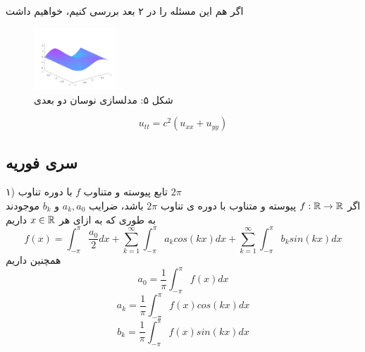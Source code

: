 اگر هم این مسئله را در ۲ بعد بررسی کنیم، خواهیم داشت\\
\begin{figure}[H]
	\centering
	\includegraphics[width=0.275\textwidth]{im05.jpg}
	\caption*{شکل ۵: مدلسازی نوسان دو بعدی\\
		\large{
		}
	}
\end{figure}
\[
u_{tt}=c^2(u_{xx}+u_{yy})
\]

\subsection*{سری فوریه}
۱) تابع پیوسته و متناوب
$f$
با دوره تناوب
$2\pi$\\
اگر 
$f:\mathbb{R}\to\mathbb{R}$
پیوسته و متناوب با دوره ی تناوب 
$2\pi$
باشد، ضرایب
$a_k,a_0$
و
$b_k$
موجودند به طوری که به ازای هر
$x\in\mathbb{R}$
داریم
\begin{equation}
	f(x)=\int_{-\pi}^{\pi}{\frac{a_0}{2}dx}+\sum_{k=1}^\infty {\int_{-\pi}^{\pi}{a_kcos(kx)dx}}+\sum_{k=1}^\infty{\int_{-\pi}^{\pi}{b_ksin(kx)dx}}
\end{equation}
همچنین داریم
\begin{equation}
	a_0=\frac{1}{\pi}\int_{-\pi}^{\pi} {f(x)dx}
\end{equation}
\begin{equation}
	a_k=\frac{1}{\pi}\int_{-\pi}^{\pi} {f(x)cos(kx)dx}
\end{equation}
\begin{equation}
	b_k=\frac{1}{\pi}\int_{-\pi}^\pi {f(x)sin(kx)dx}
\end{equation}


